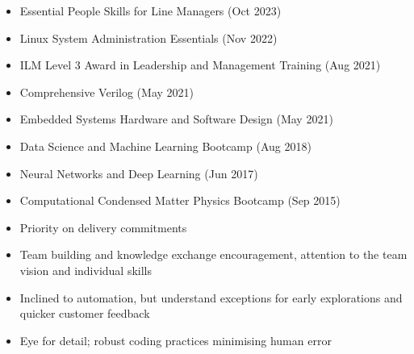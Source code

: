 \documentclass[10pt,a4paper,ragged2e,withhyper]{altacv}
\begin{document}
\begin{paracol}{2}
\begin{itemize}
    
    \item Essential People Skills for Line Managers (Oct 2023)

    \item Linux System Administration Essentials (Nov 2022)
    
    \item ILM Level 3 Award in Leadership and Management Training (Aug 2021)
    
    \item Comprehensive Verilog (May 2021)
    
    \item Embedded Systems Hardware and Software Design (May 2021)
    
    \item Data Science and Machine Learning Bootcamp (Aug 2018)
    
    \item Neural Networks and Deep Learning (Jun 2017)
    
    \item Computational Condensed Matter Physics Bootcamp (Sep 2015)
\end{itemize}



\begin{itemize}
    \item Priority on delivery commitments

    \item Team building and knowledge exchange encouragement,
    attention to the team vision and individual skills

    \item Inclined to automation, but understand exceptions for early
    explorations and quicker customer feedback
    
    \item Eye for detail; robust coding practices minimising human error


\end{itemize}
\end{paracol}
\end{document}
